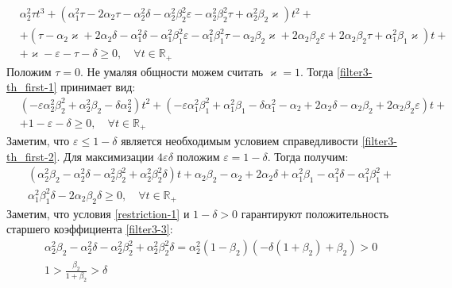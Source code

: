 \documentclass[a4paper,14pt]{article} %
\begin{document}
 \begin{equation}\label{filter3-th_first-1}
 \begin{aligned}
&\alpha_2^2\tau t^3 + (\alpha_1^2\tau - 2\alpha_2\tau - \alpha_2^2\delta - \alpha_2^2\beta_2^2\varepsilon - \alpha_2^2\beta_2^2\tau + \alpha_2^2\beta_2\varkappa)t^2 +\\
&+ (\tau - \alpha_2\varkappa + 2\alpha_2\delta - \alpha_1^2\delta - \alpha_1^2\beta_1^2\varepsilon - \alpha_1^2\beta_1^2\tau - \alpha_2\beta_2\varkappa + 2\alpha_2\beta_2\varepsilon + 2\alpha_2\beta_2\tau + \alpha_1^2\beta_1\varkappa)t + \\
&+ \varkappa - \varepsilon - \tau - \delta \geqslant 0, \quad \forall t \in \mathbb{R_+}
 \end{aligned}
\end{equation}
Положим $\tau = 0$. Не умаляя общности можем считать $\varkappa = 1$. Тогда \eqref{filter3-th_first-1} принимает вид:
 \begin{equation}\label{filter3-th_first-2}
 \begin{aligned}
&(-\varepsilon\alpha_2^2\beta_2^2 + \alpha_2^2\beta_2 - \delta\alpha_2^2)t^2 + (-\varepsilon\alpha_1^2\beta_1^2 + \alpha_1^2\beta_1 - \delta\alpha_1^2 - \alpha_2 + 2\alpha_2\delta - \alpha_2\beta_2 + 2\alpha_2\beta_2\varepsilon)t +\\
& + 1 - \varepsilon - \delta \geqslant 0, \quad \forall t \in \mathbb{R_+}
 \end{aligned}
\end{equation}
Заметим, что $\varepsilon \leqslant 1 - \delta$ является необходимым условием справедливости \eqref{filter3-th_first-2}. Для максимизации $4\varepsilon\delta$ положим $\varepsilon = 1-\delta$. Тогда получим:
 \begin{equation}\label{filter3-3}
 \begin{aligned}
&(\alpha_2^2\beta_2 - \alpha_2^2\delta - \alpha_2^2\beta_2^2 + \alpha_2^2\beta_2^2\delta)t + \alpha_2\beta_2 - \alpha_2 + 2\alpha_2\delta + \alpha_1^2\beta_1 - \alpha_1^2\delta - \alpha_1^2\beta_1^2 + \\
&\alpha_1^2\beta_1^2\delta - 2\alpha_2\beta_2\delta \geqslant 0, \quad \forall t \in \mathbb{R_+}
 \end{aligned}
\end{equation}
Заметим, что условия \eqref{restriction-1} и $1-\delta > 0$ гарантируют положительность старшего коэффициента \eqref{filter3-3}: 
 \begin{equation}
 \begin{aligned}
&\alpha_2^2\beta_2 - \alpha_2^2\delta - \alpha_2^2\beta_2^2 + \alpha_2^2\beta_2^2\delta = \alpha_2^2(1-\beta_2)( - \delta(1+\beta_2) + \beta_2) > 0\\
&1 > \frac{\beta_2}{1+\beta_2} > \delta
 \end{aligned}
\end{equation}
\end{document}
